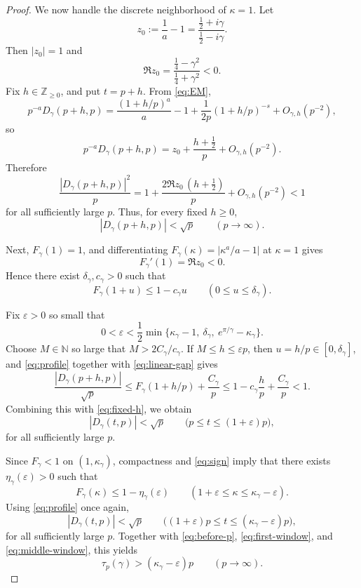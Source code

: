 \begin{proof}
We now handle the discrete neighborhood of \(\kappa=1\). Let
\[
z_0:=\frac1a-1=\frac{\frac12+i\gamma}{\frac12-i\gamma}.
\]
Then \(|z_0|=1\) and
\[
\Re z_0=\frac{\frac14-\gamma^2}{\frac14+\gamma^2}<0.
\]
Fix \(h\in\mathbb Z_{\ge 0}\), and put \(t=p+h\). From \eqref{eq:EM},
\[
p^{-a}D_\gamma(p+h,p)
=
\frac{(1+h/p)^a}{a}-1+\frac{1}{2p}(1+h/p)^{-s}+O_{\gamma,h}(p^{-2}),
\]
so
\begin{equation}
p^{-a}D_\gamma(p+h,p)
=
z_0+\frac{h+\frac12}{p}+O_{\gamma,h}(p^{-2}).
\label{eq:local}
\end{equation}
Therefore
\[
\frac{|D_\gamma(p+h,p)|^2}{p}
=
1+\frac{2\Re z_0\,(h+\frac12)}{p}+O_{\gamma,h}(p^{-2})<1
\]
for all sufficiently large \(p\). Thus, for every fixed \(h\ge 0\),
\begin{equation}
|D_\gamma(p+h,p)|<\sqrt p
\qquad (p\to\infty).
\label{eq:fixed-h}
\end{equation}

Next, \(F_\gamma(1)=1\), and differentiating \(F_\gamma(\kappa)=|\kappa^a/a-1|\) at
\(\kappa=1\) gives
\[
F_\gamma'(1)=\Re z_0<0.
\]
Hence there exist \(\delta_\gamma,c_\gamma>0\) such that
\begin{equation}
F_\gamma(1+u)\le 1-c_\gamma u
\qquad (0\le u\le \delta_\gamma).
\label{eq:linear-gap}
\end{equation}

Fix \(\varepsilon>0\) so small that
\[
0<\varepsilon<\frac12\min\{\kappa_\gamma-1,\ \delta_\gamma,\ e^{\pi/\gamma}-\kappa_\gamma\}.
\]
Choose \(M\in\mathbb N\) so large that \(M>2C_\gamma/c_\gamma\). If
\(M\le h\le \varepsilon p\), then \(u=h/p\in[0,\delta_\gamma]\), and
\eqref{eq:profile} together with \eqref{eq:linear-gap} gives
\[
\frac{|D_\gamma(p+h,p)|}{\sqrt p}
\le
F_\gamma(1+h/p)+\frac{C_\gamma}{p}
\le
1-c_\gamma\frac{h}{p}+\frac{C_\gamma}{p}
<1.
\]
Combining this with \eqref{eq:fixed-h}, we obtain
\begin{equation}
|D_\gamma(t,p)|<\sqrt p
\qquad
\bigl(p\le t\le (1+\varepsilon)p\bigr),
\label{eq:first-window}
\end{equation}
for all sufficiently large \(p\).

Since \(F_\gamma<1\) on \((1,\kappa_\gamma)\), compactness and \eqref{eq:sign} imply that
there exists \(\eta_\gamma(\varepsilon)>0\) such that
\[
F_\gamma(\kappa)\le 1-\eta_\gamma(\varepsilon)
\qquad
(1+\varepsilon\le \kappa\le \kappa_\gamma-\varepsilon).
\]
Using \eqref{eq:profile} once again,
\begin{equation}
|D_\gamma(t,p)|<\sqrt p
\qquad
\bigl((1+\varepsilon)p\le t\le (\kappa_\gamma-\varepsilon)p\bigr),
\label{eq:middle-window}
\end{equation}
for all sufficiently large \(p\). Together with \eqref{eq:before-p},
\eqref{eq:first-window}, and \eqref{eq:middle-window}, this yields
\begin{equation}
\tau_p(\gamma)>(\kappa_\gamma-\varepsilon)p
\qquad (p\to\infty).
\label{eq:lower}
\end{equation}


\end{proof}
